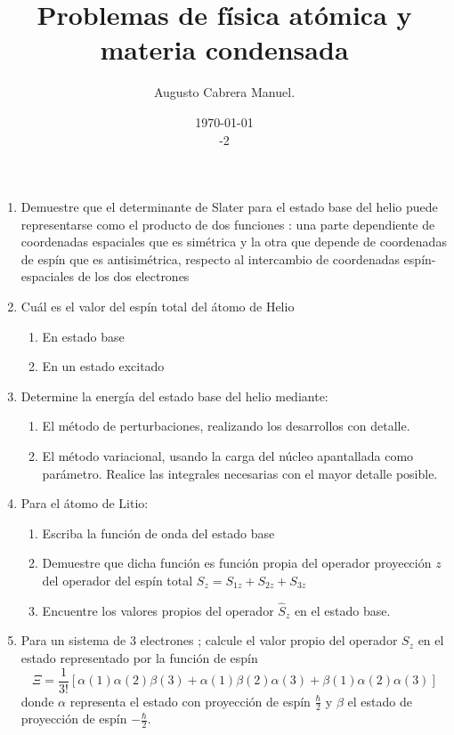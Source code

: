 \documentclass[]{article}
\title{Problemas de física atómica y materia condensada}
\author{Augusto Cabrera Manuel.}
\date{\today\\ \ser 2 \sem 2018-2 }
\begin{document}
\maketitle
\begin{enumerate}
\item Demuestre que el determinante de Slater  para el estado base  del helio puede representarse como el producto de dos funciones : una parte dependiente de coordenadas espaciales que es simétrica y la otra que depende de coordenadas de espín que es antisimétrica, respecto al intercambio de coordenadas espín-espaciales de los dos electrones
\item Cuál es el valor del espín total del átomo de Helio
  \begin{enumerate}
  \item En estado base
  \item En un estado excitado
  \end{enumerate}
\item Determine la energía del estado base del helio mediante:
  \begin{enumerate}
  \item El método de perturbaciones, realizando los desarrollos con detalle.
  \item El método variacional, usando la carga del núcleo apantallada como parámetro. Realice las integrales necesarias con el mayor detalle posible.
  \end{enumerate}
\item Para el átomo de Litio:
  \begin{enumerate}
  \item Escriba  la función de onda del estado base
  \item Demuestre que dicha función es función propia del operador proyección $z$ del operador del espín total $S_z=S_{1z}+S_{2z}+S_{3z}$
  \item Encuentre los valores propios del operador $\hat{S}_z$ en el estado base.
  \end{enumerate}
\item Para un sistema de $3$ electrones ; calcule el valor propio  del operador $S_z$ en el estado representado por la función de espín
  \begin{equation*}
    \Xi=\frac{1}{3!}\left[\alpha(1)\alpha(2)\beta(3)+\alpha(1)\beta(2)\alpha(3)+\beta(1)\alpha(2)\alpha(3)\right]
  \end{equation*}
donde $\alpha$ representa el estado con proyección de espín $\frac{\hbar}{2}$ y $\beta$ el estado de proyección de espín $-\frac{\hbar}{2}$.

\end{enumerate}
\end{document}
